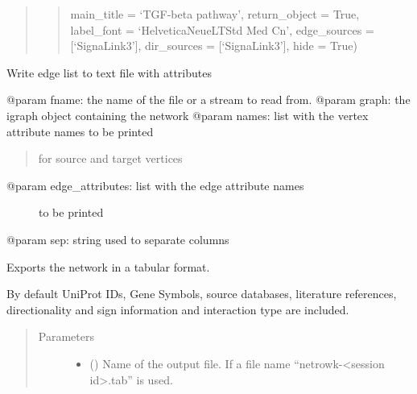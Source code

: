 \documentclass[letterpaper,10pt,english]{sphinxmanual}
\begin{document}
\begin{fulllineitems}
\begin{fulllineitems}
\begin{quote}
\begin{quote}
main\_title = ‘TGF-beta pathway’, return\_object = True,
label\_font = ‘HelveticaNeueLTStd Med Cn’,
edge\_sources = {[}‘SignaLink3’{]},
dir\_sources = {[}‘SignaLink3’{]}, hide = True)
\end{quote}
\end{quote}

\end{fulllineitems}


\begin{fulllineitems}
\label{\detokenize{main:pypath.main.PyPath.export_edgelist}}
Write edge list to text file with attributes

@param fname: the name of the file or a stream to read from.
@param graph: the igraph object containing the network
@param names: list with the vertex attribute names to be printed
\begin{quote}

for source and target vertices
\end{quote}
\begin{description}
\item[{@param edge\_attributes: list with the edge attribute names}] \leavevmode
to be printed

\end{description}

@param sep: string used to separate columns

\end{fulllineitems}


\begin{fulllineitems}
\label{\detokenize{main:pypath.main.PyPath.export_tab}}
Exports the network in a tabular format.

By default UniProt IDs, Gene Symbols, source databases, literature
references, directionality and sign information and interaction type
are included.
\begin{quote}\begin{description}
\item[{Parameters}] \leavevmode\begin{itemize}
\item {} 
 () \textendash{} Name of the output file. If  a file name
“netrowk-\textless{}session id\textgreater{}.tab” is used.


\end{itemize}
\end{description}
\end{quote}
\end{fulllineitems}
\end{fulllineitems}
\end{document}
